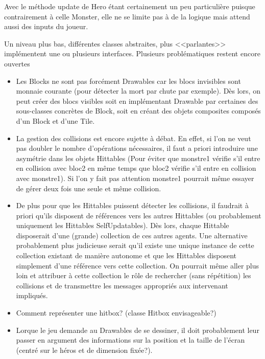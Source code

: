 \documentclass[a4paper, 12pt]{article}
\begin{document}
Avec le méthode update de Hero étant certainement un peu particulière puisque contrairement à celle Monster, elle ne se limite pas à de la logique mais attend aussi des inputs du joueur.

Un niveau plus bas, différentes classes abstraites, plus <<parlantes>> implémentent une ou plusieurs interfaces. Plusieurs problématiques restent encore ouvertes
\begin{itemize}
  \item Les Blocks ne sont pas forcément Drawables car les blocs invisibles sont monnaie courante (pour détecter la mort par chute par exemple). Dès lors, on peut créer des blocs visibles soit en implémentant Drawable par certaines des sous-classes concrètes de Block, soit en créant des objets composites composés d'un Block et d'une Tile.
  \item La gestion des collisions est encore sujette à débat. En effet, si l'on ne veut pas doubler le nombre d'opérations nécessaires, il faut a priori introduire une asymétrie dans les objets Hittables (Pour éviter que monstre1 vérifie s'il entre en collision avec bloc2 en même temps que bloc2 vérifie s'il entre en collision avec monstre1). Si l'on y fait pas attention monstre1 pourrait même essayer de gérer deux fois une seule et même collision.
  \item De plus pour que les Hittables puissent détecter les collisions, il faudrait à priori qu'ils disposent de références vers les autres Hittables (ou probablement uniquement les Hittables SelfUpdatables). Dès lors, chaque Hittable disposerait d'une (grande) collection de ces autres agents. Une alternative probablement plus judicieuse serait qu'il existe une unique instance de cette collection existant de manière autonome et que les Hittables disposent simplement d'une référence vers cette collection. On pourrait même aller plus loin et attribuer à cette collection le rôle de rechercher (sans répétition) les collisions et de transmettre les messages appropriés aux intervenant impliqués.
  \item Comment représenter une hitbox? (classe Hitbox envisageable?)
  \item Lorque le jeu demande au Drawables de se dessiner, il doit probablement leur passer en argument des informations sur la position et la taille de l'écran (centré sur le héros et de dimension fixée?).
\end{itemize}
\end{document}
